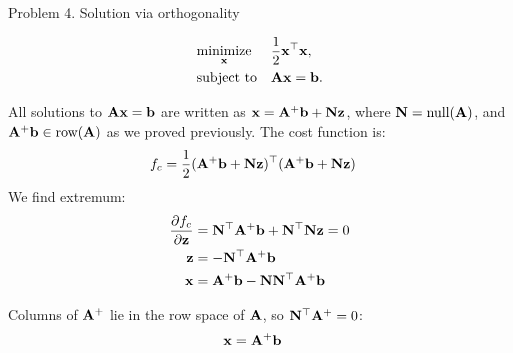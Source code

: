 \documentclass{beamer}
\begin{document}
\begin{frame}{Problem 4. Solution via orthogonality}
	\begin{flushleft}
		
		\begin{small}
		\begin{equation}
			\begin{aligned}
				& \underset{\mathbf{x}}{\text{minimize}}
				& & \frac{1}{2} \mathbf{x}^\top \mathbf{x}, \\
				& \text{subject to}
				& & \mathbf{A} \mathbf{x} = \mathbf{b}.
			\end{aligned}
		\end{equation}
		
		All solutions to $\mathbf{A} \mathbf{x} = \mathbf{b}$ are written as $\mathbf{x} = \mathbf{A}^+\mathbf{b} + \mathbf{N}\mathbf{z}$, where $\mathbf{N} = \text{null}(\mathbf{A})$, and $\mathbf{A}^+\mathbf{b} \in \text{row}(\mathbf{A})$ as we proved previously.  The cost function is:
		\begin{align}
			f_c &= \frac{1}{2} (\mathbf{A}^+\mathbf{b} + \mathbf{N}\mathbf{z})^\top (\mathbf{A}^+\mathbf{b} + \mathbf{N}\mathbf{z}) 
		\end{align}
		We find extremum:
		\begin{align}
			\frac{\partial f_c}{\partial \mathbf{z}} &= \mathbf{N}^\top \mathbf{A}^+\mathbf{b} + \mathbf{N}^\top\mathbf{N}\mathbf{z} = 0
			\\
			\mathbf{z} &= - \mathbf{N}^\top \mathbf{A}^+\mathbf{b} 
			\\
			\mathbf{x} &= \mathbf{A}^+\mathbf{b} -  \mathbf{N}\mathbf{N}^\top \mathbf{A}^+\mathbf{b} 
		\end{align}
		
		Columns of $\mathbf{A}^+$ lie in the row space of $\mathbf{A}$, so $\mathbf{N}^\top \mathbf{A}^+ = 0$:
		\begin{align}
			\mathbf{x} &= \mathbf{A}^+\mathbf{b}
		\end{align}
	\end{small}
		
	\end{flushleft}
\end{frame}
\end{document}

